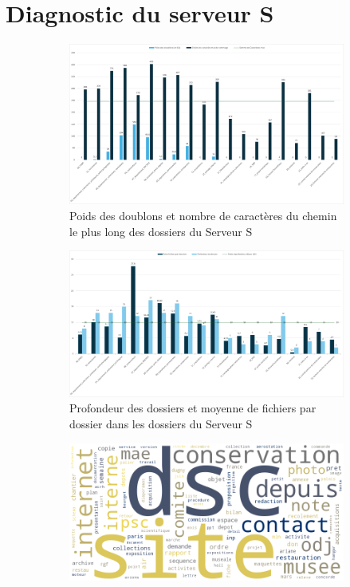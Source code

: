 \documentclass[12pt,twoside]{book}
\begin{document}
	\chapter{\label{Ax-H}Diagnostic du serveur S}
	\begin{figure}[htbp]
		\centering
		\begin{subfigure}{0.75\textwidth}
			\centering
			\includegraphics[width=\linewidth]{img/GRAPH_doublons_caracteres}
			\caption{Poids des doublons et nombre de caractères du chemin le plus long des dossiers du Serveur S}
			\label{fig:diagdoublonscaracteres}
		\end{subfigure}
		\begin{subfigure}{0.75\textwidth}
			\centering
			\includegraphics[width=\linewidth]{img/GRAPH_profondeur_ratio}
			\caption{Profondeur des dossiers et moyenne de fichiers par dossier dans les dossiers du Serveur S}
			\label{fig:diagprofondeurratio}
		\end{subfigure}
		\hfill
		\begin{subfigure}{0.65\textwidth}
			\centering
			\includegraphics[width=\linewidth]{img/IMG_motscles_fonctionnel}

\end{subfigure}
\end{figure}
\end{document}
